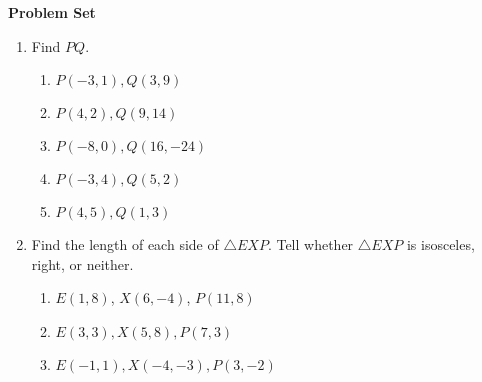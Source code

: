 \textbf{Problem Set}

\vspce
\begin{enumerate}[label = \Alph*. ]
\item \hspce Find $PQ$. 
\begin{enumerate}[label = \arabic*. ]
\item $P(-3, 1), Q(3, 9)$
\item $P(4, 2), Q(9, 14)$
\item $P(-8, 0), Q(16, -24)$
\item $P(-3, 4), Q(5, 2)$
\item $P(4, 5), Q(1,3)$
\end{enumerate} 

\item \hspce Find the  length  of each side of $\triangle EXP$. Tell whether $\triangle EXP$ is isosceles, right, or neither. 
\begin{enumerate}[label = \arabic*. ]
\item $E(1,8)$, $X(6,-4)$, $P(11,8)$
\item $E(3,3), X(5,8), P(7,3)$ 
\item $E(-1,1), X(-4,-3), P(3,-2) $

\end{enumerate} 
\end{enumerate} 




